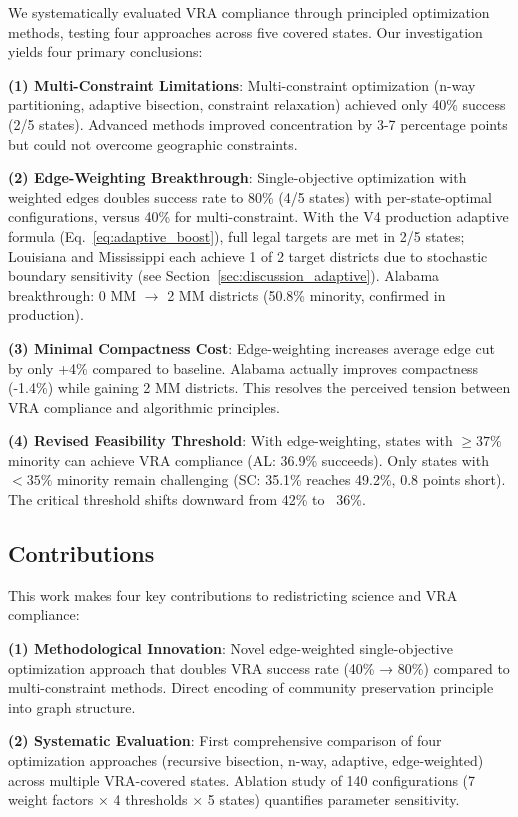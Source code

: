 We systematically evaluated VRA compliance through principled optimization methods, testing four approaches across five covered states. Our investigation yields four primary conclusions:

\textbf{(1) Multi-Constraint Limitations}: Multi-constraint optimization (n-way partitioning, adaptive bisection, constraint relaxation) achieved only 40\% success (2/5 states). Advanced methods improved concentration by 3-7 percentage points but could not overcome geographic constraints.

\textbf{(2) Edge-Weighting Breakthrough}: Single-objective optimization with weighted edges doubles success rate to 80\% (4/5 states) with per-state-optimal configurations, versus 40\% for multi-constraint. With the V4 production adaptive formula (Eq.~\ref{eq:adaptive_boost}), full legal targets are met in 2/5 states; Louisiana and Mississippi each achieve 1 of 2 target districts due to stochastic boundary sensitivity (see Section~\ref{sec:discussion_adaptive}). Alabama breakthrough: 0 MM $\to$ 2 MM districts (50.8\% minority, confirmed in production).

\textbf{(3) Minimal Compactness Cost}: Edge-weighting increases average edge cut by only +4\% compared to baseline. Alabama actually improves compactness (-1.4\%) while gaining 2 MM districts. This resolves the perceived tension between VRA compliance and algorithmic principles.

\textbf{(4) Revised Feasibility Threshold}: With edge-weighting, states with $\geq 37\%$ minority can achieve VRA compliance (AL: 36.9\% succeeds). Only states with $<35\%$ minority remain challenging (SC: 35.1\% reaches 49.2\%, 0.8 points short). The critical threshold shifts downward from 42\% to ~36\%.

\subsection{Contributions}

This work makes four key contributions to redistricting science and VRA compliance:

\textbf{(1) Methodological Innovation}: Novel edge-weighted single-objective optimization approach that doubles VRA success rate (40\% → 80\%) compared to multi-constraint methods. Direct encoding of community preservation principle into graph structure.

\textbf{(2) Systematic Evaluation}: First comprehensive comparison of four optimization approaches (recursive bisection, n-way, adaptive, edge-weighted) across multiple VRA-covered states. Ablation study of 140 configurations (7 weight factors × 4 thresholds × 5 states) quantifies parameter sensitivity.

